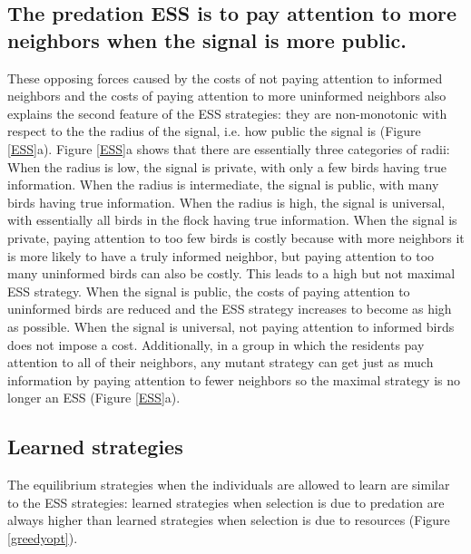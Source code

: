 \documentclass{article}
\begin{document}
\subsection{The predation ESS is to pay attention to more neighbors when the signal is more public.}
These opposing forces caused by the costs of not paying attention to informed neighbors  and the costs of paying attention to more uninformed neighbors  also explains the second feature of the ESS strategies: they are non-monotonic with respect to the the radius of the signal, i.e. how public the signal is (Figure \ref{ESS}a). Figure \ref{ESS}a shows that there are essentially three categories of radii: When the radius is low, the signal is private, with only a few birds having true information. When the radius is intermediate, the signal is public, with many birds having true information. When the radius is high, the signal is universal, with essentially all birds in the flock having true information. When the signal is private, paying attention to too few birds is costly because with more neighbors it is more likely to have a truly informed neighbor, but paying attention to too many uninformed birds can also be costly. This leads to a high but not maximal ESS strategy. When the signal is public, the costs of paying attention to uninformed birds are reduced and the ESS strategy increases to become as high as possible. When the signal is universal, not paying attention to informed birds does not impose a cost. Additionally, in a group in which the residents pay attention to all of their neighbors, any mutant strategy can get just as much information by paying attention to fewer neighbors so the maximal strategy is no longer an ESS (Figure \ref{ESS}a).


\subsection{Learned strategies }
The equilibrium strategies when the individuals are allowed to learn are similar to the ESS strategies: learned strategies when selection is due to predation are always higher than learned strategies when selection is due to resources (Figure \ref{greedyopt}). 
\end{document}
